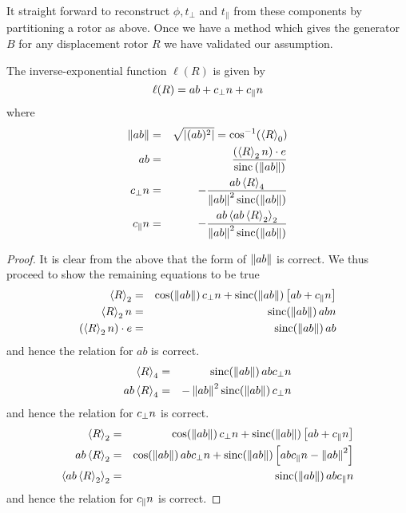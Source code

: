 It straight forward to reconstruct $\phi, t_\perp$ and
$t_\parallel$ from these components by partitioning a rotor as above. Once we
have a method which gives the generator $B$ for any displacement rotor $R$ we
have validated our assumption.

\begin{thm}
The inverse-exponential function $\ell(R)$ is given by
\[
\ell(R) = ab + c_\perp n + c_\parallel n
\]
where
\begin{eqnarray*}
\left\Vert ab \right\Vert & = & \sqrt{\left| (ab)^2 \right|}  = \cos^{-1}(\left<R\right>_0) \\
ab & = & \frac{\left(\left<R\right>_2 n \right) \cdot e}
{\mathrm{sinc}\left(\left\Vert ab \right\Vert\right)}\\
c_\perp n & = & - \frac{ab \left<R\right>_4}
{\left\Vert ab \right\Vert^2\mathrm{sinc}(\left\Vert ab \right\Vert)} \\
c_\parallel n & = & - \frac{ab \left<ab \left<R\right>_2\right>_2}
{\left\Vert ab \right\Vert^2\mathrm{sinc}(\left\Vert ab \right\Vert)}
\end{eqnarray*}
\end{thm}
\begin{proof}
It is clear from the above that the form of
$\left\Vert ab \right\Vert$ is correct. We thus proceed to show the remaining
equations to be true
\begin{eqnarray*}
\left<R\right>_2 & = & \cos(\left\Vert ab \right\Vert) \, c_\perp n +
\mathrm{sinc}(\left\Vert ab \right\Vert) \left[ab + c_\parallel n\right]\\
\left<R\right>_2 n & = & \mathrm{sinc}(\left\Vert ab \right\Vert) \, abn\\
\left(\left<R\right>_2 n\right) \cdot e & = & \mathrm{sinc}(\left\Vert ab \right\Vert) \, ab
\end{eqnarray*}
and hence the relation for $ab$ is correct.
\begin{eqnarray*}
\left<R\right>_4 & = & \mathrm{sinc}(\left\Vert ab \right\Vert) \, abc_\perp n \\
ab \left<R\right>_4 & = & -\left\Vert ab \right\Vert^2 \mathrm{sinc}(\left\Vert ab \right\Vert) \, c_\perp n 
\end{eqnarray*}
and hence the relation for $c_\perp n$ is correct.
\begin{eqnarray*}
\left<R\right>_2 & = & \cos(\left\Vert ab \right\Vert) \, c_\perp n +
\mathrm{sinc}(\left\Vert ab \right\Vert) \left[ab + c_\parallel n\right]\\
ab \left<R\right>_2 & = & \cos(\left\Vert ab \right\Vert) \, abc_\perp n +
\mathrm{sinc}(\left\Vert ab \right\Vert) \left[ab c_\parallel n - \left\Vert ab \right\Vert^2\right]\\
\left<ab \left<R\right>_2\right>_2 & = & 
\mathrm{sinc}(\left\Vert ab \right\Vert) \, ab c_\parallel n
\end{eqnarray*}
and hence the relation for $c_\parallel n$ is correct.
\end{proof}

